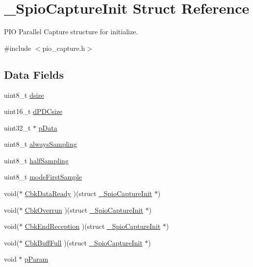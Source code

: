 \hypertarget{struct__SpioCaptureInit}{}\section{\+\_\+\+Spio\+Capture\+Init Struct Reference}
\label{struct__SpioCaptureInit}


P\+IO Parallel Capture structure for initialize.  




{\ttfamily \#include $<$pio\+\_\+capture.\+h$>$}

\subsection*{Data Fields}
\begin{DoxyCompactItemize}
\item 
uint8\+\_\+t \mbox{\hyperlink{struct__SpioCaptureInit_aa61d21b099a20dda3d273d2c3ef08c1c}{dsize}}
\item 
uint16\+\_\+t \mbox{\hyperlink{struct__SpioCaptureInit_a1402f112a86ef3d729ba75a871c8e2c5}{d\+P\+D\+Csize}}
\item 
uint32\+\_\+t $\ast$ \mbox{\hyperlink{struct__SpioCaptureInit_a715f93923ccb98814ee7eb2ef16d389b}{p\+Data}}
\item 
uint8\+\_\+t \mbox{\hyperlink{struct__SpioCaptureInit_acbd56db5ae34a038a697f0d4f66de27c}{always\+Sampling}}
\item 
uint8\+\_\+t \mbox{\hyperlink{struct__SpioCaptureInit_a429498d58892dca1006e5c95b9d166be}{half\+Sampling}}
\item 
uint8\+\_\+t \mbox{\hyperlink{struct__SpioCaptureInit_af38cf37ee3bbfa29eeb6cc32377743e3}{mode\+First\+Sample}}
\item 
void($\ast$ \mbox{\hyperlink{struct__SpioCaptureInit_aff4b26df573a3abc87acee0ca6aaed3d}{Cbk\+Data\+Ready}} )(struct \mbox{\hyperlink{struct__SpioCaptureInit}{\+\_\+\+Spio\+Capture\+Init}} $\ast$)
\item 
void($\ast$ \mbox{\hyperlink{struct__SpioCaptureInit_a544450416a7f46f05116d719168ad6db}{Cbk\+Overrun}} )(struct \mbox{\hyperlink{struct__SpioCaptureInit}{\+\_\+\+Spio\+Capture\+Init}} $\ast$)
\item 
void($\ast$ \mbox{\hyperlink{struct__SpioCaptureInit_a964bb5183e0cc519ee1b9fd4b49d052b}{Cbk\+End\+Reception}} )(struct \mbox{\hyperlink{struct__SpioCaptureInit}{\+\_\+\+Spio\+Capture\+Init}} $\ast$)
\item 
void($\ast$ \mbox{\hyperlink{struct__SpioCaptureInit_a898d2894025577b0dc6ca45734f0ec76}{Cbk\+Buff\+Full}} )(struct \mbox{\hyperlink{struct__SpioCaptureInit}{\+\_\+\+Spio\+Capture\+Init}} $\ast$)
\item 
void $\ast$ \mbox{\hyperlink{struct__SpioCaptureInit_a956c111d8a0f8a753b6e02a11f25c459}{p\+Param}}
\end{DoxyCompactItemize}



